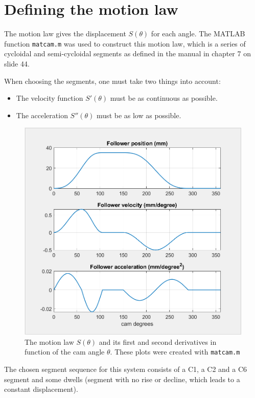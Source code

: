 \documentclass[a4paper]{article}
\begin{document}
\clearpage
\tableofcontents

\section{Defining the motion law}

The motion law gives the displacement \(S(\theta)\) for each angle. The MATLAB function \texttt{matcam.m} was used to construct this motion law, which is a series of cycloidal and semi-cycloidal segments as defined in the manual \cite{cursus} in chapter 7 on slide 44.

When choosing the segments, one must take two things into account:
\begin{itemize}
	\item The velocity function \(S'(\theta)\) must be as continuous as possible.
	\item The acceleration \(S''(\theta)\) must be as low as possible.
\end{itemize}


\begin{figure}[H]
	\centering
	\includegraphics[width=.7\textwidth]{hefwet.png}
	\caption{The motion law \(S(\theta)\) and its first and second derivatives in function of the cam angle \(\theta\). These plots were created with \texttt{matcam.m}}
	\label{fig:hefwet}
	
\end{figure}

The chosen segment sequence for this system consists of a C1, a C2 and a C6 segment and some dwells (segment with no rise or decline, which leads to a constant displacement).
\end{document}
